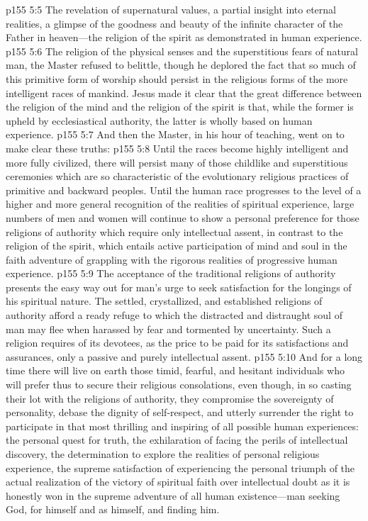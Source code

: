 \pc \vs p155 5:5 \bibnobreakspace {} The revelation of supernatural values, a partial insight into eternal realities, a glimpse of the goodness and beauty of the infinite character of the Father in heaven---the religion of the spirit as demonstrated in human experience.
\pc \vs p155 5:6 The religion of the physical senses and the superstitious fears of natural man, the Master refused to belittle, though he deplored the fact that so much of this primitive form of worship should persist in the religious forms of the more intelligent races of mankind. Jesus made it clear that the great difference between the religion of the mind and the religion of the spirit is that, while the former is upheld by ecclesiastical authority, the latter is wholly based on human experience.
\pc \vs p155 5:7 And then the Master, in his hour of teaching, went on to make clear these truths:
\pc \vs p155 5:8 Until the races become highly intelligent and more fully civilized, there will persist many of those childlike and superstitious ceremonies which are so characteristic of the evolutionary religious practices of primitive and backward peoples. Until the human race progresses to the level of a higher and more general recognition of the realities of spiritual experience, large numbers of men and women will continue to show a personal preference for those religions of authority which require only intellectual assent, in contrast to the religion of the spirit, which entails active participation of mind and soul in the faith adventure of grappling with the rigorous realities of progressive human experience.
\vs p155 5:9 The acceptance of the traditional religions of authority presents the easy way out for man’s urge to seek satisfaction for the longings of his spiritual nature. The settled, crystallized, and established religions of authority afford a ready refuge to which the distracted and distraught soul of man may flee when harassed by fear and tormented by uncertainty. Such a religion requires of its devotees, as the price to be paid for its satisfactions and assurances, only a passive and purely intellectual assent.
\vs p155 5:10 And for a long time there will live on earth those timid, fearful, and hesitant individuals who will prefer thus to secure their religious consolations, even though, in so casting their lot with the religions of authority, they compromise the sovereignty of personality, debase the dignity of self\hyp{}respect, and utterly surrender the right to participate in that most thrilling and inspiring of all possible human experiences: the personal quest for truth, the exhilaration of facing the perils of intellectual discovery, the determination to explore the realities of personal religious experience, the supreme satisfaction of experiencing the personal triumph of the actual realization of the victory of spiritual faith over intellectual doubt as it is honestly won in the supreme adventure of all human existence---man seeking God, for himself and as himself, and finding him.
